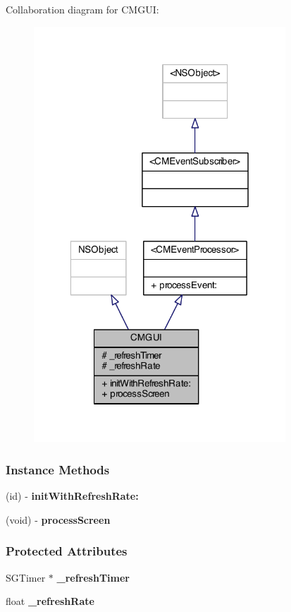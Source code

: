 Collaboration diagram for C\-M\-G\-U\-I\-:
\nopagebreak
\begin{figure}[H]
\begin{center}
\leavevmode
\includegraphics[width=268pt]{interface_c_m_g_u_i__coll__graph}
\end{center}
\end{figure}
\subsubsection*{Instance Methods}
\begin{DoxyCompactItemize}
\item 
(id) -\/ {\bf init\-With\-Refresh\-Rate\-:}
\item 
(void) -\/ {\bf process\-Screen}
\end{DoxyCompactItemize}
\subsubsection*{Protected Attributes}
\begin{DoxyCompactItemize}
\item 
S\-G\-Timer $\ast$ {\bf \-\_\-refresh\-Timer}
\item 
float {\bf \-\_\-refresh\-Rate}
\end{DoxyCompactItemize}


